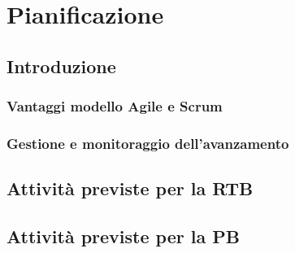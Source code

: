 \newpage

\section{Pianificazione}

\subsection{Introduzione}
\subsubsection{Vantaggi modello Agile e Scrum}
\subsubsection{Gestione e monitoraggio dell'avanzamento}

\subsection{Attività previste per la RTB}

\subsection{Attività previste per la PB}

